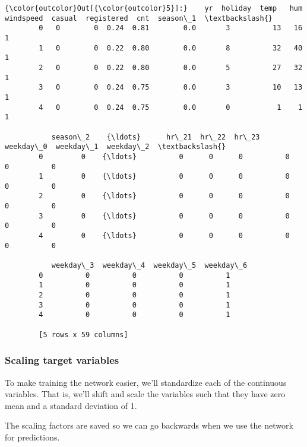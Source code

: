 \documentclass[11pt]{article}
\begin{document}
\begin{Verbatim}[commandchars=\\\{\}]
{\color{outcolor}Out[{\color{outcolor}5}]:}    yr  holiday  temp   hum  windspeed  casual  registered  cnt  season\_1  \textbackslash{}
        0   0        0  0.24  0.81        0.0       3          13   16         1   
        1   0        0  0.22  0.80        0.0       8          32   40         1   
        2   0        0  0.22  0.80        0.0       5          27   32         1   
        3   0        0  0.24  0.75        0.0       3          10   13         1   
        4   0        0  0.24  0.75        0.0       0           1    1         1   
        
           season\_2    {\ldots}      hr\_21  hr\_22  hr\_23  weekday\_0  weekday\_1  weekday\_2  \textbackslash{}
        0         0    {\ldots}          0      0      0          0          0          0   
        1         0    {\ldots}          0      0      0          0          0          0   
        2         0    {\ldots}          0      0      0          0          0          0   
        3         0    {\ldots}          0      0      0          0          0          0   
        4         0    {\ldots}          0      0      0          0          0          0   
        
           weekday\_3  weekday\_4  weekday\_5  weekday\_6  
        0          0          0          0          1  
        1          0          0          0          1  
        2          0          0          0          1  
        3          0          0          0          1  
        4          0          0          0          1  
        
        [5 rows x 59 columns]
\end{Verbatim}
            
    \hypertarget{scaling-target-variables}{%
\subsubsection{Scaling target
variables}\label{scaling-target-variables}}

To make training the network easier, we'll standardize each of the
continuous variables. That is, we'll shift and scale the variables such
that they have zero mean and a standard deviation of 1.

The scaling factors are saved so we can go backwards when we use the
network for predictions.
\end{document}
